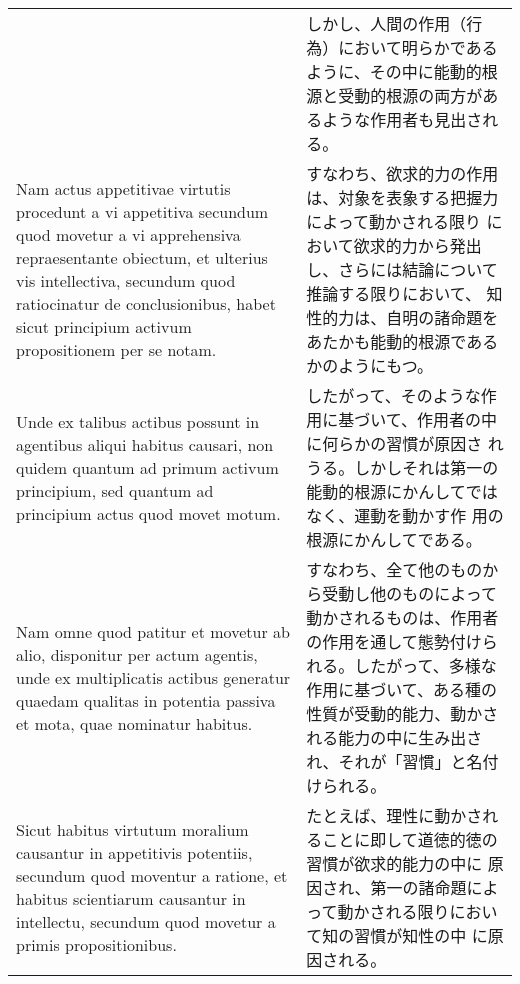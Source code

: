 \documentclass[10pt]{jsarticle} %
\begin{document}
\begin{longtable}{p{21em}p{21em}}
&

しかし、人間の作用（行為）において明らかであるように、その中に能動的根源と受動的根源の両方があるような作用者も見出される。

\\

Nam actus appetitivae virtutis
 procedunt a vi appetitiva secundum quod movetur a vi apprehensiva
 repraesentante obiectum, et ulterius vis intellectiva, secundum quod
 ratiocinatur de conclusionibus, habet sicut principium activum
 propositionem per se notam. 

&

すなわち、欲求的力の作用は、対象を表象する把握力によって動かされる限り
において欲求的力から発出し、さらには結論について推論する限りにおいて、
知性的力は、自明の諸命題をあたかも能動的根源であるかのようにもつ。

\\


Unde ex talibus actibus possunt in agentibus aliqui habitus causari,
non quidem quantum ad primum activum principium, sed quantum ad
principium actus quod movet motum.


&

したがって、そのような作用に基づいて、作用者の中に何らかの習慣が原因さ
れうる。しかしそれは第一の能動的根源にかんしてではなく、運動を動かす作
用の根源にかんしてである。

\\

Nam omne quod patitur et movetur ab alio, disponitur per actum
agentis, unde ex multiplicatis actibus generatur quaedam qualitas in
potentia passiva et mota, quae nominatur habitus.


&

すなわち、全て他のものから受動し他のものによって動かされるものは、作用者の作用を通して態勢付けられる。したがって、多様な作用に基づいて、ある種の性質が受動的能力、動かされる能力の中に生み出され、それが「習慣」と名付けられる。

\\

Sicut habitus virtutum moralium causantur in appetitivis potentiis,
secundum quod moventur a ratione, et habitus scientiarum causantur in
intellectu, secundum quod movetur a primis propositionibus.

&

たとえば、理性に動かされることに即して道徳的徳の習慣が欲求的能力の中に
原因され、第一の諸命題によって動かされる限りにおいて知の習慣が知性の中
に原因される。


\end{longtable}
\end{document}
